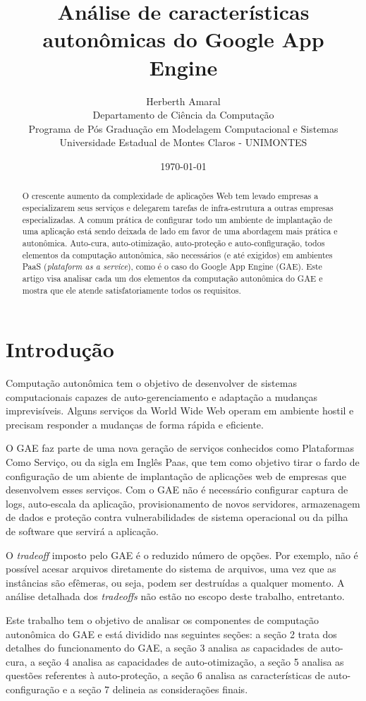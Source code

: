 \documentclass[12pt]{article}
\title{Análise de características autonômicas do Google App Engine}
\author{
Herberth Amaral \\
Departamento de Ciência da Computação\\
Programa de Pós Graduação em Modelagem Computacional e Sistemas\\
Universidade Estadual de Montes Claros - UNIMONTES\\
}
\date{\today}
\begin{document}
\maketitle

\begin{abstract}
    O crescente aumento da complexidade de aplicações Web tem levado empresas a
    especializarem seus serviços e delegarem tarefas de infra-estrutura a
    outras empresas especializadas. A comum prática de configurar todo um
    ambiente de implantação de uma aplicação está sendo deixada de lado em
    favor de uma abordagem mais prática e autonômica.  Auto-cura,
    auto-otimização, auto-proteção e auto-configuração, todos elementos da
    computação autonômica, são necessários (e até exigidos) em ambientes PaaS
    (\textit{plataform as a service}), como é o caso do Google App Engine (GAE).
    Este artigo visa analisar cada um dos elementos da computação autonômica do
    GAE e mostra que ele atende satisfatoriamente todos os requisitos.
\end{abstract}

\section{Introdução}
Computação autonômica tem o objetivo de desenvolver de sistemas computacionais
capazes de auto-gerenciamento e adaptação a mudanças imprevisíveis. Alguns
serviços da World Wide Web operam em ambiente hostil e precisam responder a
mudanças de forma rápida e eficiente.

O GAE faz parte de uma nova geração de serviços conhecidos como Plataformas
Como Serviço, ou da sigla em Inglês Paas, que tem como objetivo tirar o fardo
de configuração de um abiente de implantação de aplicações web de empresas que
desenvolvem esses serviços. Com o GAE não é necessário configurar captura de
logs, auto-escala da aplicação, provisionamento de novos servidores,
armazenagem de dados e proteção contra vulnerabilidades de sistema operacional
ou da pilha de software que servirá a aplicação.

O \textit{tradeoff} imposto pelo GAE é o reduzido número de opções. Por
exemplo, não é possível acesar arquivos diretamente do sistema de arquivos, uma
vez que as instâncias são efêmeras, ou seja, podem ser destruídas a qualquer
momento. A análise detalhada dos \textit{tradeoffs} não estão no escopo deste
trabalho, entretanto.

Este trabalho tem o objetivo de analisar os componentes de computação
autonômica do GAE e está dividido nas seguintes seções: a seção 2 trata dos
detalhes do funcionamento do GAE, a seção 3 analisa as capacidades de
auto-cura, a seção 4 analisa as capacidades de auto-otimização, a seção 5
analisa as questões referentes à auto-proteção, a seção 6 analisa as
características de auto-configuração e a seção 7 delineia as considerações
finais.
\end{document}
